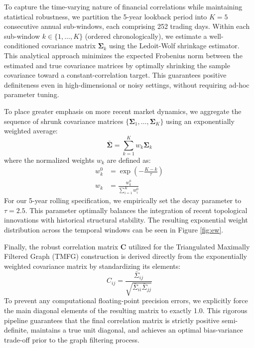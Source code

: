 \documentclass[fleqn]{rbfin}
\begin{document}
To capture the time-varying nature of financial correlations while maintaining statistical robustness, we partition the 5-year lookback period into $K=5$ consecutive annual sub-windows, each comprising 252 trading days. Within each sub-window $k \in \{1, \dots, K\}$ (ordered chronologically), we estimate a well-conditioned covariance matrix $\boldsymbol{\Sigma}_k$ using the Ledoit-Wolf shrinkage estimator. This analytical approach minimizes the expected Frobenius norm between the estimated and true covariance matrices by optimally shrinking the sample covariance toward a constant-correlation target. This guarantees positive definiteness even in high-dimensional or noisy settings, without requiring ad-hoc parameter tuning.

To place greater emphasis on more recent market dynamics, we aggregate the sequence of shrunk covariance matrices $\{\boldsymbol{\Sigma}_1, \dots, \boldsymbol{\Sigma}_K\}$ using an exponentially weighted average:
\begin{equation}
    \bar{\boldsymbol{\Sigma}} = \sum_{k=1}^{K} w_k \boldsymbol{\Sigma}_k
\end{equation}
where the normalized weights $w_k$ are defined as:
\begin{align}
    w^0_k &= \exp\left(-\frac{K-k}{\tau}\right) \\
    w_k &= \frac{w^0_k}{\sum_{i=1}^K w^0_i}
\end{align}
For our 5-year rolling specification, we empirically set the decay parameter to $\tau = 2.5$. This parameter optimally balances the integration of recent topological innovations with historical structural stability. The resulting exponential weight distribution across the temporal windows can be seen in Figure \ref{fig:ew}.

Finally, the robust correlation matrix $\mathbf{C}$ utilized for the Triangulated Maximally Filtered Graph (TMFG) construction is derived directly from the exponentially weighted covariance matrix by standardizing its elements:
\begin{equation}
    C_{ij} = \frac{\bar{\Sigma}_{ij}}{\sqrt{\bar{\Sigma}_{ii} \bar{\Sigma}_{jj}}}
\end{equation}
To prevent any computational floating-point precision errors, we explicitly force the main diagonal elements of the resulting matrix to exactly 1.0. This rigorous pipeline guarantees that the final correlation matrix is strictly positive semi-definite, maintains a true unit diagonal, and achieves an optimal bias-variance trade-off prior to the graph filtering process.
\end{document}
